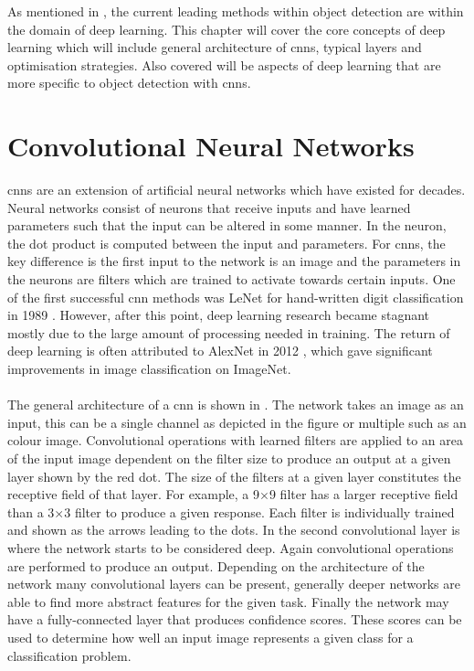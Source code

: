 As mentioned in , the current leading methods within object detection are within the domain of deep learning. This chapter will cover the core concepts of deep learning which will include general architecture of \glspl{cnn}, typical layers and optimisation strategies. Also covered will be aspects of deep learning that are more specific to object detection with \glspl{cnn}.

\section{Convolutional Neural Networks}
\glspl{cnn} are an extension of artificial neural networks which have existed for decades. Neural networks consist of neurons that receive inputs and have learned parameters such that the input can be altered in some manner. In the neuron, the dot product is computed between the input and parameters. For \glspl{cnn}, the key difference is the first input to the network is an image and the parameters in the neurons are filters which are trained to activate towards certain inputs. One of the first successful \gls{cnn} methods was LeNet for hand-written digit classification in 1989 \cite{lenet}. However, after this point, deep learning research became stagnant mostly due to the large amount of processing needed in training. The return of deep learning is often attributed to AlexNet in 2012 \cite{alexnet}, which gave significant improvements in image classification on ImageNet.
\\\\
The general architecture of a \gls{cnn} is shown in . The network takes an image as an input, this can be a single channel as depicted in the figure or multiple such as an colour image. Convolutional operations with learned filters are applied to an area of the input image dependent on the filter size to produce an output at a given layer shown by the red dot. The size of the filters at a given layer constitutes the receptive field of that layer. For example, a 9$\times$9 filter has a larger receptive field than a 3$\times$3 filter to produce a given response. Each filter is individually trained and shown as the arrows leading to the dots. In the second convolutional layer is where the network starts to be considered deep. Again convolutional operations are performed to produce an output. Depending on the architecture of the network many convolutional layers can be present, generally deeper networks are able to find more abstract features for the given task. Finally the network may have a fully-connected layer that produces confidence scores. These scores can be used to determine how well an input image represents a given class for a classification problem.

